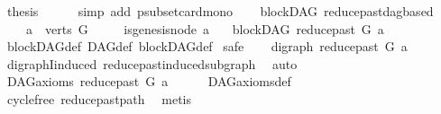 \begin{isabellebody}
\ {\isacharquery}{\kern0pt}thesis\isanewline
\ \ \ \ \isamarkupfalse%
\ {\isacharparenleft}{\kern0pt}simp\ add{\isacharcolon}{\kern0pt}\ psubset{\isacharunderscore}{\kern0pt}card{\isacharunderscore}{\kern0pt}mono{\isacharparenright}{\kern0pt}\isanewline
{}\isamarkupfalse%
%
\endisatagproof
{\isafoldproof}%
%
\isadelimproof
\ \isanewline
%
\endisadelimproof
\isanewline
\isanewline
\isanewline
\isanewline
\isanewline
\isanewline
{}\isamarkupfalse%
\ {\isacharparenleft}{\kern0pt}\ blockDAG{\isacharparenright}{\kern0pt}\ reduce{\isacharunderscore}{\kern0pt}past{\isacharunderscore}{\kern0pt}dagbased{\isacharcolon}{\kern0pt}\isanewline
\ \ \ {\isachardoublequoteopen}\ a\ {\isasymin}\ verts\ G{\isachardoublequoteclose}\isanewline
\ \ \ \ \ {\isachardoublequoteopen}{\isasymnot}is{\isacharunderscore}{\kern0pt}genesis{\isacharunderscore}{\kern0pt}node\ a{\isachardoublequoteclose}\isanewline
\ \ \ {\isachardoublequoteopen}blockDAG\ {\isacharparenleft}{\kern0pt}reduce{\isacharunderscore}{\kern0pt}past\ G\ a{\isacharparenright}{\kern0pt}{\isachardoublequoteclose}\isanewline
%
\isadelimproof
\ \ %
\endisadelimproof
%
\isatagproof
{}\isamarkupfalse%
\ blockDAG{\isacharunderscore}{\kern0pt}def\ DAG{\isacharunderscore}{\kern0pt}def\ blockDAG{\isacharunderscore}{\kern0pt}def\isanewline
\isanewline
{}\isamarkupfalse%
\ safe\isanewline
\ \ \isamarkupfalse%
\ {\isachardoublequoteopen}digraph\ {\isacharparenleft}{\kern0pt}reduce{\isacharunderscore}{\kern0pt}past\ G\ a{\isacharparenright}{\kern0pt}{\isachardoublequoteclose}\isanewline
\ \ \ \ \isamarkupfalse%
\ digraphI{\isacharunderscore}{\kern0pt}induced\ reduce{\isacharunderscore}{\kern0pt}past{\isacharunderscore}{\kern0pt}induced{\isacharunderscore}{\kern0pt}subgraph\ \isamarkupfalse%
\ auto\ \ \isanewline
{}\isamarkupfalse%
\isanewline
\ \ \isamarkupfalse%
\ {\isachardoublequoteopen}DAG{\isacharunderscore}{\kern0pt}axioms\ {\isacharparenleft}{\kern0pt}reduce{\isacharunderscore}{\kern0pt}past\ G\ a{\isacharparenright}{\kern0pt}{\isachardoublequoteclose}\isanewline
\ \ \ \ \isamarkupfalse%
\ DAG{\isacharunderscore}{\kern0pt}axioms{\isacharunderscore}{\kern0pt}def\isanewline
\ \ \ \ \isamarkupfalse%
\ cycle{\isacharunderscore}{\kern0pt}free\ reduce{\isacharunderscore}{\kern0pt}past{\isacharunderscore}{\kern0pt}path\ \isamarkupfalse%
\ metis\ \isanewline

\end{isabellebody}
